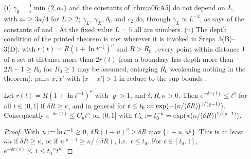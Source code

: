 \begin{remark}\label{rem:a06A:L}
(i) $\gamma_\emptyset=\frac14\min\{2,a_*\}$ and the constants of \cref{thm:a06:A5} do not depend on $L$, with $a_*\ge3a/4$ for $L\ge2$; $\gamma_L$, $\gamma_X$, $\theta_0$ and $c_2$ do, through $\gamma_L\propto L^{-2}$, as \cite[p.~588]{Ba4} says of the constants of \cite[(2.37)]{Ba4} and \cite[Prop.~2.3]{Ba1}. At the fixed value $L=5$ all are numbers. (ii) The depth condition of the printed theorem is met wherever it is invoked in Steps~3(B)--3(D): with $r(t)=R(1+\ln t^{-1})^\varrho$ and $R>R_0$ \cite[(2.7)]{Ba2}, every point within distance $1$ of a set at distance more than $2r(t)$ from a boundary has depth more than $2R-1\ge R_0$ (as $R_0\ge1$ may be assumed, enlarging $R_0$ weakening nothing in the theorem); pairs $x,x'$ with $|x-x'|>1$ in \cite[(1.9)]{Ba4} reduce to the sup bounds \cite[p.~578]{Ba4}.
\end{remark}

\begin{lemma}\label{lem:a06A:polylog}
Let $r(t)=R(1+\ln t^{-1})^\varrho$ with $\varrho>1$, and $\delta,R,\kappa>0$. Then $e^{-\delta r(t)}\le t^\kappa$ for all $t\in(0,1]$ if $\delta R\ge\kappa$, and in general for $t\le t_0:=\exp(-(\kappa/(\delta R))^{1/(\varrho-1)})$. Consequently $e^{-\delta r(t)}\le C_\kappa t^\kappa$ on $(0,1]$ with $C_\kappa:= t_0^{-\kappa}=\exp(\kappa(\kappa/(\delta R))^{1/(\varrho-1)})$.
\end{lemma}

\begin{proof}
With $u:=\ln t^{-1}\ge0$, $\delta R(1+u)^\varrho\ge\delta R\max\{1+u,u^\varrho\}$. This is at least $\kappa u$ if $\delta R\ge\kappa$, or if $u^{\varrho-1}\ge\kappa/(\delta R)$, i.e.\ $t\le t_0$. For $t\in[t_0,1]$, $e^{-\delta r(t)}\le1\le t_0^{-\kappa}t^\kappa$.
\end{proof}


